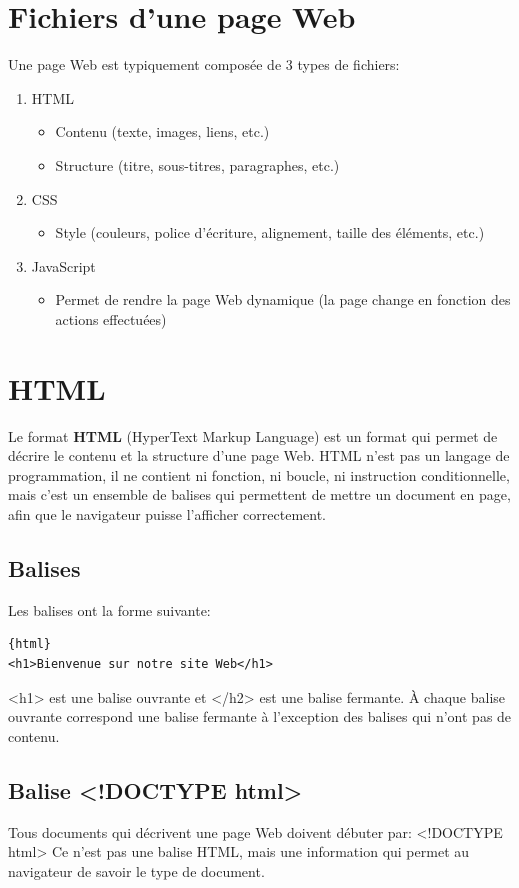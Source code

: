 \documentclass[a4paper,11pt]{article}
\begin{document}
\section{Fichiers d'une page Web}
Une page Web est typiquement composée de 3 types de fichiers:
\begin{enumerate}[label=\arabic*)]
\item HTML
\begin{itemize}
  \item Contenu (texte, images, liens, etc.)
  \item Structure (titre, sous-titres, paragraphes, etc.)
\end{itemize}
\item CSS
\begin{itemize}
  \item Style (couleurs, police d'écriture, alignement, taille des éléments, etc.)
\end{itemize}
\item JavaScript
\begin{itemize}
  \item Permet de rendre la page Web dynamique (la page change en fonction des actions effectuées)
\end{itemize}
\end{enumerate}

\section{HTML}
Le format \textbf{HTML} (HyperText Markup Language) est un format qui permet de décrire le contenu et la structure d'une page Web. HTML n'est pas un langage de programmation, il ne contient ni fonction, ni boucle, ni instruction conditionnelle, mais c'est un ensemble de balises qui permettent de mettre un document en page, afin que le navigateur puisse l'afficher correctement.

\subsection{Balises}
Les balises ont la forme suivante:
\begin{verbatim}{html}
<h1>Bienvenue sur notre site Web</h1>
\end{verbatim}
<h1> est une balise ouvrante et </h2> est une balise fermante. À chaque balise ouvrante correspond une balise fermante à l'exception des balises qui n'ont pas de contenu.

\subsection{Balise <!DOCTYPE html>}
Tous documents qui décrivent une page Web doivent débuter par:  <!DOCTYPE html>
Ce n'est pas une balise HTML, mais une information qui permet au navigateur de savoir le type de document.
\end{document}
